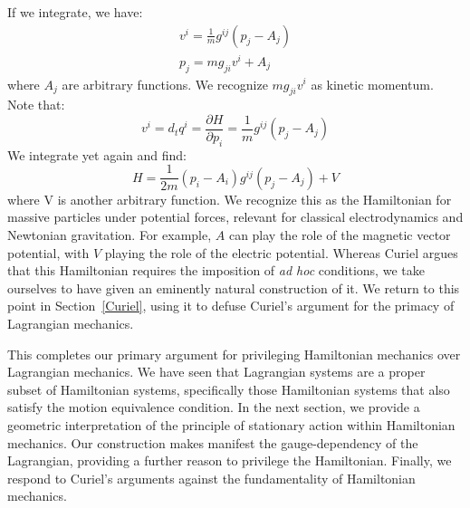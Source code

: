 \documentclass[12pt, twoside]{article}
\begin{document}
If we integrate, we have:
\begin{equation} \label{linear_relationship}
\begin{aligned}
v^i = \frac{1}{m} g^{ij}(p_j - A_j) \\
p_j = m g_{ji} v^i + A_j
\end{aligned}
\end{equation}
where $A_j$ are arbitrary functions. We recognize $m g_{ji} v^i$ as kinetic momentum. Note that:
\begin{equation}
v^i = d_t q^i = \frac{\partial H }{\partial p_i} = \frac{1}{m} g^{ij}(p_j - A_j) 
\end{equation}
We integrate yet again and find:
\begin{equation} \label{massive_Hamiltonian}
H = \frac{1}{2m} (p_i - A_i) g^{ij}(p_j - A_j) + V 
\end{equation}
where V is another arbitrary function. We recognize this as the Hamiltonian for massive particles under potential forces, relevant for classical electrodynamics and Newtonian gravitation. For example, $A$ can play the role of the magnetic vector potential, with $V$ playing the role of the electric potential. Whereas Curiel \parencites*[]{Curiel} argues that this Hamiltonian requires the imposition of \textit{ad hoc} conditions, we take ourselves to have given an eminently natural construction of it. We return to this point in Section~\ref{Curiel}, using it to defuse Curiel's argument for the primacy of Lagrangian mechanics.

This completes our primary argument for privileging Hamiltonian mechanics over Lagrangian mechanics. We have seen that Lagrangian systems are a proper subset of Hamiltonian systems, specifically those Hamiltonian systems that also satisfy the motion equivalence condition. In the next section, we provide a geometric interpretation of the principle of stationary action within Hamiltonian mechanics. Our construction makes manifest the gauge-dependency of the Lagrangian, providing a further reason to privilege the Hamiltonian. Finally, we respond to Curiel's arguments against the fundamentality of Hamiltonian mechanics.
\end{document}
